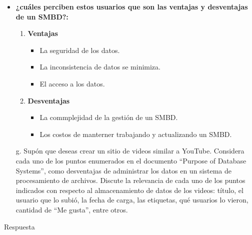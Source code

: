 \documentclass{article}
\begin{document}
\begin{enumerate}
\begin{itemize}
        \item \textbf{¿cuáles perciben estos usuarios que son las ventajas y desventajas de un SMBD?:}
        \begin{enumerate}
            \item \textbf{Ventajas}
            \begin{itemize}
                \item La seguridad de los datos.
                \item La inconsistencia de datos se minimiza.
                \item El acceso a los datos.
            \end{itemize}
            \item \textbf{Desventajas}
            \begin{itemize}
                \item La commplejidad de la gestión de un SMBD.
                \item Los costos de manterner trabajando y actualizando un SMBD.
                
            \end{itemize}
        \end{enumerate}
    \end{itemize}
    

    
\begin{itemize}
    \item[g.]Supón que deseas crear un sitio de videos similar a YouTube. Considera cada uno de los puntos enumerados en el documento “Purpose of Database Systems”, como desventajas de administrar los datos en un sistema de procesamiento de archivos. Discute la relevancia de cada uno de los puntos indicados con respecto al almacenamiento de datos de los videos: título, el usuario que lo subió, la fecha de carga, las etiquetas, qué usuarios lo vieron, cantidad de “Me gusta”, entre otros.
    \end{itemize}
    
    Respuesta
    

\end{enumerate}
\end{document}
